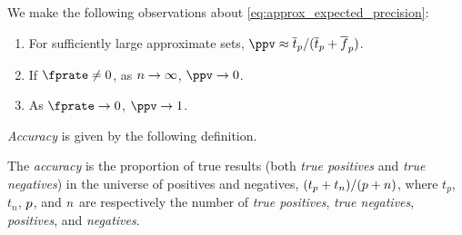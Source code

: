 \documentclass[ ../main.tex]{subfiles}
\begin{document}
We make the following observations about \cref{eq:approx_expected_precision}:
\begin{enumerate}
	\item For sufficiently large approximate sets, $\ppv \approx 
	\overline{t}_\p / (\overline{t}_\p + \overline{f}_\p)$.
	\item If $\fprate \neq 0$, as $n \to \infty$, $\ppv \to 0$.
	\item As $\fprate \to 0$, $\ppv \to 1$.
\end{enumerate}

\emph{Accuracy} is given by the following definition.
\begin{definition}
	The \emph{accuracy} is the proportion of true results (both \emph{true 
	positives} and \emph{true negatives}) in the universe of positives and 
	negatives, $(t_p + t_n)/(p + n)$, where $t_p$, $t_n$, $p$, and $n$ are 
	respectively the number of \emph{true positives}, \emph{true negatives}, 
	\emph{positives}, and \emph{negatives}.
\end{definition}
\end{document}

